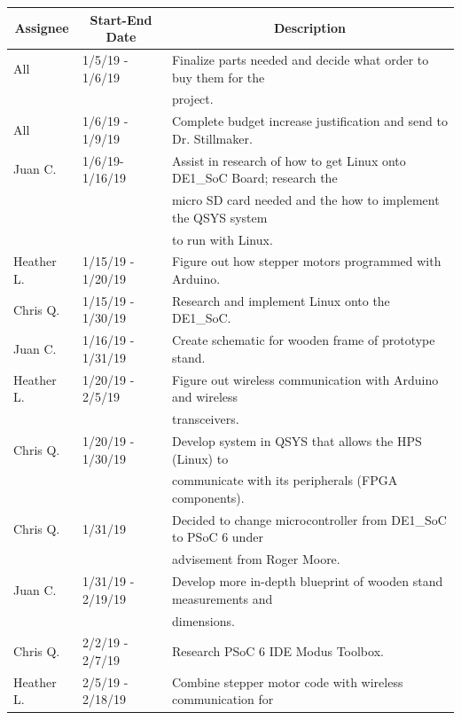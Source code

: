 \begin{table} [H]	
	\normalsize
	\centering
	\begin{tabular}{|l|l|l|}
		\hline
		\multicolumn{1}{|c|}{\textbf{Assignee}} & \multicolumn{1}{|c|}{\textbf{Start-End Date}} & \multicolumn{1}{|c|}{\textbf{Description}} \\
		\hline
		All & 1/5/19 - 1/6/19 			& Finalize parts needed and decide what order to buy them for the \\
		& & project. \\
		\hline
		All & 1/6/19 - 1/9/19 			& Complete budget increase justification and send to Dr. Stillmaker. \\
		\hline
		Juan C. & 1/6/19-1/16/19	 	& Assist in research of how to get Linux onto DE1\_SoC Board; research the \\
				&						& micro SD card needed and the how to implement the QSYS system \\
				&						& to run with Linux. \\
		\hline
		Heather L. & 1/15/19 - 1/20/19 	& Figure out how stepper motors programmed with Arduino. \\
		\hline
		Chris Q. & 1/15/19 - 1/30/19 	& Research and implement Linux onto the DE1\_SoC. \\
		\hline
		Juan C. & 1/16/19 - 1/31/19 	& Create schematic for wooden frame of prototype stand. \\
		\hline
		Heather L. & 1/20/19 - 2/5/19 	& Figure out wireless communication with Arduino and wireless \\ 			&					& transceivers. \\
		\hline
		Chris Q. & 1/20/19 - 1/30/19 	& Develop system in QSYS that allows the HPS (Linux) to \\
				&						& communicate with its peripherals (FPGA components). \\
		\hline
		Chris Q. & 1/31/19 				& Decided to change microcontroller from DE1\_SoC to PSoC 6 under \\ 
				&						& advisement from Roger Moore. \\
		\hline
		Juan C. & 1/31/19 - 2/19/19 	& Develop more in-depth blueprint of wooden stand measurements and \\
				&						& dimensions. \\
				\hline
		Chris Q. & 2/2/19 - 2/7/19 		& Research PSoC 6 IDE Modus Toolbox. \\
		\hline
		Heather L. & 2/5/19 - 2/18/19 	& Combine stepper motor code with wireless communication for \\

\end{tabular}
\end{table}
